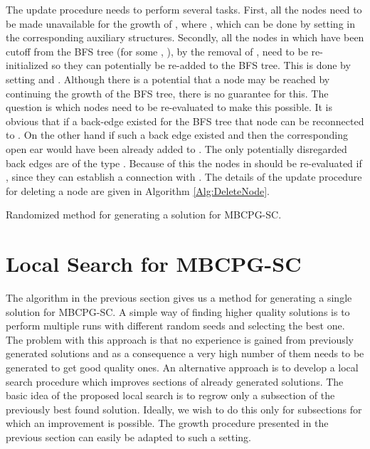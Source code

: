 The update procedure needs to perform several tasks. First, all the nodes  need to be made unavailable for the growth of , where , which can be done by setting  in the corresponding auxiliary structures. Secondly, all the nodes in  which have been cutoff from the BFS tree (for some , ), by the removal of , need to be re-initialized so they can potentially be re-added to the BFS tree. This is done by setting  and . Although there is a potential that a node   may be reached by continuing the growth of the BFS tree, there is no guarantee for this.  The question is which nodes need to be re-evaluated to make this possible. It is obvious that if a back-edge   existed for the BFS tree that node  can be reconnected to . On the other hand if such a back edge existed and  then the corresponding open ear would have been already added to . The only potentially disregarded back edges  are of the type .  Because of this  the nodes in   should be re-evaluated if  , since they can  establish a connection with . The details of the update procedure for deleting a node are given in Algorithm \ref{Alg:DeleteNode}.

\begin{algorithm}
\begin{algorithmic}
\ForAll{  }
\State{ }
\ForAll{}
   \If{}
	\State{}	
	\State{}
\EndIf
\EndFor

\ForAll{}

\State{ }
\EndFor
\EndFor
\EndProcedure


\end{algorithmic}

\caption{\label{Alg:DeleteNode} Randomized method for generating a solution for MBCPG-SC.}
\end{algorithm}


\section{Local Search for MBCPG-SC}

The algorithm in the previous section gives us a method for generating a single solution for MBCPG-SC.  A simple way of finding higher quality solutions is to perform multiple runs with different random seeds and selecting the best one. The problem with this approach is that no experience is gained from previously generated solutions and as a consequence a very high number of them needs to be generated to get good quality ones. An alternative approach is to develop a local search procedure which improves sections of already generated solutions. The basic idea of the proposed local search is to regrow only a subsection  of the previously best found solution. Ideally, we wish to do this only  for  subsections for which an improvement is possible. The growth procedure presented in the previous section can easily be adapted to such a setting. 

